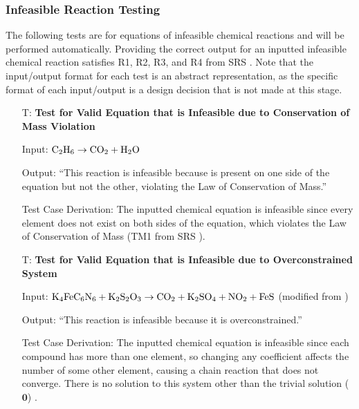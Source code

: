 \documentclass[12pt, titlepage]{article}
\newcounter{testnum} %
\begin{document}
\subsubsection{Infeasible Reaction Testing}

The following tests are for equations of infeasible chemical reactions and
will be performed automatically. Providing the correct output for an inputted
infeasible chemical reaction satisfies R1, R2, R3, and R4 from SRS . Note that the input/output format
for each test is an abstract representation, as the specific format of each
input/output is a design decision that is not made at this stage.

\begin{enumerate}

  \item[T\refstepcounter{testnum}\thetestnum \label{test_inf_cons_mass_valid_eqn}:]
    \textbf{Test for Valid Equation that is Infeasible due to Conservation of Mass
      Violation}

    Input: $\ce{C2H6} \rightarrow \ce{CO2} + \ce{H2O}$

    Output: ``This reaction is infeasible because  is present on one side
    of the equation but not the other, violating the Law of Conservation of
    Mass.''

    Test Case Derivation: The inputted chemical equation is infeasible since
    every element does not exist on both sides of the equation, which violates
    the Law of Conservation of Mass (TM1 from SRS ).

  \item[T\refstepcounter{testnum}\thetestnum \label{test_inf_over_valid_eqn}:]
    \textbf{Test for Valid Equation that is Infeasible due to Overconstrained
      System}

    Input: $\ce{K4FeC6N6} + \ce{K2S2O3} \rightarrow \ce{CO2} + \ce{K2SO4} +
      \ce{NO2} + \ce{FeS}$ (modified from \cite{hamid_balancing_2019})

    Output: ``This reaction is infeasible because it is overconstrained.''

    Test Case Derivation: The inputted chemical equation is infeasible since
    each compound has more than one element, so changing any coefficient
    affects the number of some other element, causing a chain reaction that
    does not converge. There is no solution to this system other than the
    trivial solution ($\mathbf{0}$) \cite{hamid_balancing_2019}.

\end{enumerate}
\end{document}
